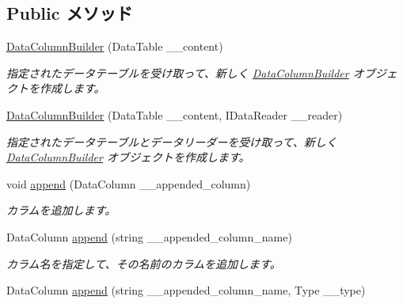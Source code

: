 \subsection*{Public メソッド}
\begin{DoxyCompactItemize}
\item 
\hyperlink{classlazurite_1_1pattern_1_1building_1_1_data_column_builder_aaca320aa6a173a52ed2a3e6cde3157de}{DataColumnBuilder} (DataTable \_\-\_\-content)
\begin{DoxyCompactList}\small\item\em 指定されたデータテーブルを受け取って、新しく \hyperlink{classlazurite_1_1pattern_1_1building_1_1_data_column_builder}{DataColumnBuilder} オブジェクトを作成します。 \item\end{DoxyCompactList}\item 
\hyperlink{classlazurite_1_1pattern_1_1building_1_1_data_column_builder_a650ecdc496195439ed1c6f69b82c7cd9}{DataColumnBuilder} (DataTable \_\-\_\-content, IDataReader \_\-\_\-reader)
\begin{DoxyCompactList}\small\item\em 指定されたデータテーブルとデータリーダーを受け取って、新しく \hyperlink{classlazurite_1_1pattern_1_1building_1_1_data_column_builder}{DataColumnBuilder} オブジェクトを作成します。 \item\end{DoxyCompactList}\item 
void \hyperlink{classlazurite_1_1pattern_1_1building_1_1_data_column_builder_abad09561aa109d0bd234df7ee848e272}{append} (DataColumn \_\-\_\-appended\_\-column)
\begin{DoxyCompactList}\small\item\em カラムを追加します。 \item\end{DoxyCompactList}\item 
DataColumn \hyperlink{classlazurite_1_1pattern_1_1building_1_1_data_column_builder_aadbc572ee7e5626046051abf63b37cdd}{append} (string \_\-\_\-appended\_\-column\_\-name)
\begin{DoxyCompactList}\small\item\em カラム名を指定して、その名前のカラムを追加します。 \item\end{DoxyCompactList}\item 
DataColumn \hyperlink{classlazurite_1_1pattern_1_1building_1_1_data_column_builder_a0bfb1d32a8d779f85a12f40a093dd6ea}{append} (string \_\-\_\-appended\_\-column\_\-name, Type \_\-\_\-type)

\end{DoxyCompactItemize}
